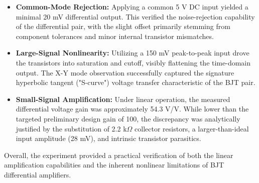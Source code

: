 \documentclass[12pt]{article}
\begin{document}
\begin{itemize}
    \item \textbf{Common-Mode Rejection:} Applying a common 5 V DC input yielded a minimal 20 mV differential output. This verified the noise-rejection capability of the differential pair, with the slight offset primarily stemming from component tolerances and minor internal transistor mismatches.
    
    \item \textbf{Large-Signal Nonlinearity:} Utilizing a 150 mV peak-to-peak input drove the transistors into saturation and cutoff, visibly flattening the time-domain output. The X-Y mode observation successfully captured the signature hyperbolic tangent ("S-curve") voltage transfer characteristic of the BJT pair.
    
    \item \textbf{Small-Signal Amplification:} Under linear operation, the measured differential voltage gain was approximately 54.3 V/V. While lower than the targeted preliminary design gain of 100, the discrepancy was analytically justified by the substitution of 2.2 k$\Omega$ collector resistors, a larger-than-ideal input amplitude (28 mV), and intrinsic transistor parasitics.
\end{itemize}

Overall, the experiment provided a practical verification of both the linear amplification capabilities and the inherent nonlinear limitations of BJT differential amplifiers.
\end{document}
